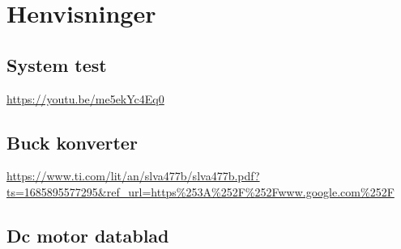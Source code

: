 \section{Henvisninger} \label{Chap:Henvisninger}
\subsection{System test}\label{subsection:System test}
\url{https://youtu.be/me5ekYc4Eq0}

\subsection{Buck konverter}\label{subsection:Buck konverter}
\url{https://www.ti.com/lit/an/slva477b/slva477b.pdf?ts=1685895577295&ref_url=https%253A%252F%252Fwww.google.com%252F}

\subsection{Dc motor datablad}\label{subsection:dc_motor_datablad}
